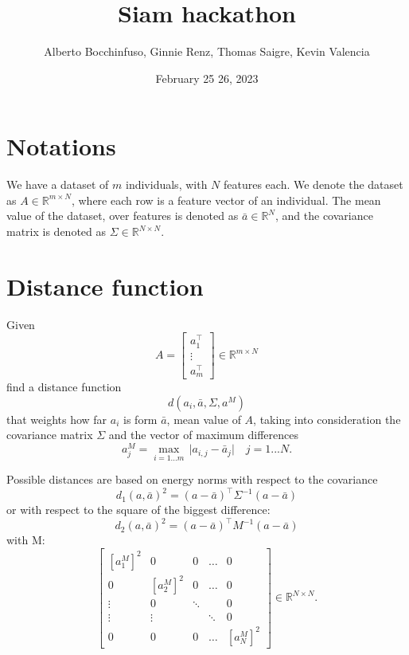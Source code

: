 \documentclass{article}
\author{Alberto Bocchinfuso, Ginnie Renz, Thomas Saigre, Kevin Valencia}
\title{Siam hackathon}
\date{February 25 26, 2023}
\newcommand{\R}{\mathbb{R}}
\begin{document}
	\maketitle


\section{Notations}

We have a dataset of $m$ individuals, with $N$ features each.
We denote the dataset as $A \in \R^{m \times N}$, where each row is a feature vector of an individual.
The mean value of the dataset, over features is denoted as $\bar{a} \in \R^N$, and the covariance matrix is denoted as $\Sigma \in \R^{N \times N}$.

\section{Distance function}

Given
\begin{equation}
	A = \begin{bmatrix}
		a_1^\top \\
		\vdots \\
		a_m^\top
	\end{bmatrix} \in \R^{m \times N}
\end{equation}
find a distance function
\begin{equation}
	d(a_i, \bar{a}, \Sigma, a^{M})
\end{equation}
that weights how far $a_i$ is form $\bar{a}$, mean value of $A$, taking into consideration the covariance matrix $\Sigma$ and the vector of maximum differences
\begin{equation}
	a^{M}_j = \max_{i=1...m} \, \vert a_{i,j} - \bar{a}_j \vert \quad j=1...N .
\end{equation}

Possible distances are based on energy norms with respect to the covariance
\begin{equation}
	d_1(a, \bar{a})^2 = (a - \bar{a})^\top \Sigma^{-1} (a - \bar{a})
\end{equation}
or with respect to the square of the biggest difference:
\begin{equation}
	d_2(a, \bar{a})^2 = (a - \bar{a})^\top M^{-1} (a - \bar{a})
\end{equation}
with M:
\begin{equation}
\begin{bmatrix}
	\left[ a_1^M \right]^2	&0	&0	&\dots 	&0 \\
	0	&\left[ a_2^M \right]^2	&0	&\dots	&0 \\
	\vdots	&0	&\ddots	&	&0 \\
	\vdots	&\vdots	&	&\ddots	&0 \\
	0	&0	&0	&\dots	&\left[ a_N^M \right]^2
\end{bmatrix} \in \R^{N\times N}.
\end{equation}
\end{document}
